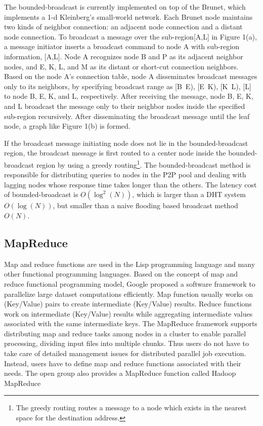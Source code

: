 \documentclass{acm_proc_article-sp}
\begin{document}
The bounded-broadcast is currently implemented on top of the Brunet\cite{brunet}, which implements a 1-d Kleinberg's small-world network.
Each Brunet node maintains two kinds of neighbor connection: an adjacent node connection and a distant node connection.
To broadcast a message over the sub-region[A,L] in Figure 1(a), a message initiator inserts a broadcast command to node A with sub-region information, [A,L]. 
Node A recognizes node B and P as its adjacent neighbor nodes, and  E, K, L, and M as its distant or short-cut connection neighbors.
Based on the node A's connection table, node A disseminates broadcast messages only to its neighbors, by specifying broadcast range as [B~E), [E~K), [K~L), [L] to node B, E, K, and L, respectively.
After receiving the message, node B, E, K, and L broadcast the message only to their neighbor nodes inside the specified sub-region recursively. 
After disseminating the broadcast message until the leaf node, a graph like Figure 1(b) is formed.

If the broadcast message initiating node does not lie in the bounded-broadcast region, the broadcast message is first routed to a center node inside the bounded-broadcast region by using a greedy routing\footnote{The greedy routing routes a message to a node which exists in the nearest space for the destination address.}.
The bounded-broadcast method is responsible for distributing queries to nodes in the P2P pool and dealing with lagging nodes whose response time takes longer than the others. 
The latency cost of bounded-broadcast is  $O(\log^2(N))$\cite{deetoo}, which is larger than a DHT system $O(\log(N))$\cite{chord}, but smaller than a naive flooding based broadcast method$O(N)$.


\subsection{MapReduce}
Map and reduce functions are used in the Lisp programming language and many other functional programming languages. 
Based on the concept of map and reduce functional programming model, Google proposed a software framework to parallelize large dataset computations efficiently\cite{google_mapreduce}.
Map function usually works on (Key/Value) pairs to create intermediate (Key/Value) results. 
Reduce functions work on intermediate (Key/Value) results while aggregating intermediate values associated with the same intermediate keys.
The MapReduce framework supports distributing map and reduce tasks among nodes in a cluster to enable parallel processing, dividing input files into multiple chunks. 
Thus users do not have to take care of detailed management issues for distributed parallel job execution. 
Instead, users have to define map and reduce functions associated with their needs.
The open group also provides a MapReduce function called Hadoop MapReduce\cite{hadoop}
\end{document}
